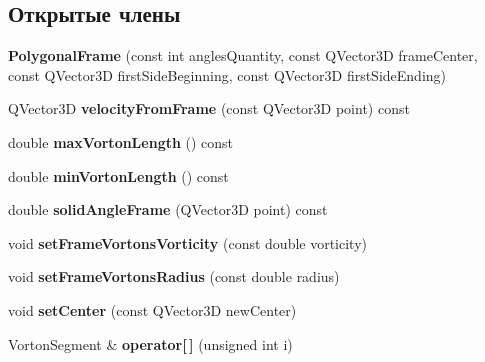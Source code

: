 \subsection*{Открытые члены}
\begin{DoxyCompactItemize}
\item 
\mbox{\label{class_polygonal_frame_a515a8220e2fba8d2c6d0c3fc43f509ad}} 
{\bfseries Polygonal\+Frame} (const int angles\+Quantity, const Q\+Vector3D frame\+Center, const Q\+Vector3D first\+Side\+Beginning, const Q\+Vector3D first\+Side\+Ending)
\item 
\mbox{\label{class_polygonal_frame_afee1ef0fa80467fcdb3e7c5e989ce2a7}} 
Q\+Vector3D {\bfseries velocity\+From\+Frame} (const Q\+Vector3D point) const
\item 
\mbox{\label{class_polygonal_frame_a500a2a03a041d85883acf503d956568e}} 
double {\bfseries max\+Vorton\+Length} () const
\item 
\mbox{\label{class_polygonal_frame_a33d0b8e5cf32fd3b4a67f34487360cb8}} 
double {\bfseries min\+Vorton\+Length} () const
\item 
\mbox{\label{class_polygonal_frame_a92e3714e167e6eed9d2f5aa067173005}} 
double {\bfseries solid\+Angle\+Frame} (Q\+Vector3D point) const
\item 
\mbox{\label{class_polygonal_frame_ad9b5e3de14a65d3f89c4bcc36a5f9995}} 
void {\bfseries set\+Frame\+Vortons\+Vorticity} (const double vorticity)
\item 
\mbox{\label{class_polygonal_frame_ab27653110a27a44b1890140217267678}} 
void {\bfseries set\+Frame\+Vortons\+Radius} (const double radius)
\item 
\mbox{\label{class_polygonal_frame_a483bcc83b0781f1407a7ebb108618225}} 
void {\bfseries set\+Center} (const Q\+Vector3D new\+Center)
\item 
\mbox{\label{class_polygonal_frame_a99160b916a903bf0175576a238e7b399}} 
Vorton\+Segment \& {\bfseries operator\mbox{[}$\,$\mbox{]}} (unsigned int i)
\end{DoxyCompactItemize}
